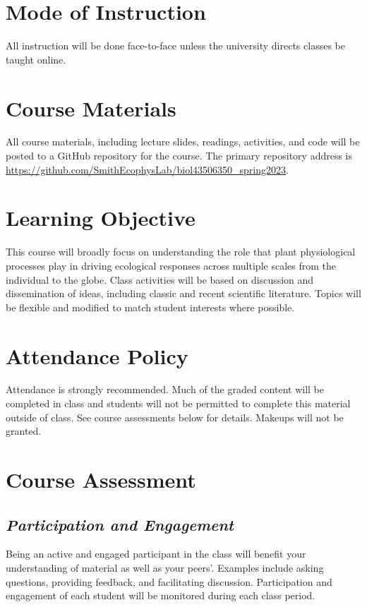 \documentclass[12pt, notitlepage]{article}   	%
\begin{document}
{\section{Mode of Instruction}
All instruction will be done face-to-face unless the university directs classes be 
taught online.

\section{Course Materials}
All course materials, including lecture slides, readings, activities, and code 
will be posted to a GitHub repository for the course.
The primary repository address is
\url{https://github.com/SmithEcophysLab/biol43506350_spring2023}.

\section{Learning Objective}
This course will broadly focus on understanding the role that plant physiological 
processes play in driving ecological responses across multiple scales from the individual 
to the globe. Class activities will be based on discussion and dissemination of ideas, 
including classic and recent scientific literature. 
Topics will be flexible and modified to match student interests where possible.

\section{Attendance Policy}
Attendance is strongly recommended. 
Much of the graded content will be completed in class and students will not be permitted
to complete this material outside of class. See course assessments below for details.
Makeups will not be granted.

\section{Course Assessment}
\subsection{\textit{Participation and Engagement}}
Being an active and engaged participant in the class will benefit your understanding
of material as well as your peers'. Examples include asking questions, providing feedback,
and facilitating discussion. Participation and engagement of each student will be monitored
during each class period.

}
\end{document}
